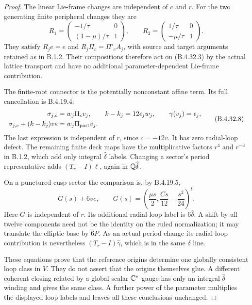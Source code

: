 \begin{proof}
The linear Lie-frame changes are independent of $c$ and $r$.
For the two generating finite peripheral changes they are
\[
 R_1=
 \begin{pmatrix}-1/\tau&0\\(1-\mu)/\tau&1\end{pmatrix},
 \qquad
 R_2=
 \begin{pmatrix}1/\tau&0\\-\mu/\tau&1\end{pmatrix}.
 \tag{B.4.32.7}
\]
They satisfy $R_je=e$ and $R_j\Pi_c=\Pi'_cA_j$, with
source and target arguments retained as in B.1.2. Their
compositions therefore act on (B.4.32.3) by the actual lattice
transport and have no additional parameter-dependent
Lie-frame contribution.

The finite-root connector is the potentially nonconstant
affine term. Its full cancellation is B.4.19.4:
\[
 \begin{split}
  \sigma_{j,c}&=w_j\Pi_c v_j,\qquad
   k-k_j=12\epsilon_jw_j,\qquad
   \gamma(v_j)=\epsilon_j,\\
  \sigma_{j,c}+(k-k_j)ve
     &=w_j\Pi_{\rm part}v_j .
 \end{split}
 \tag{B.4.32.8}
\]
The last expression is independent of $r$, since $c=-12v$.
It has zero radial-loop defect. The remaining finite deck
maps have the multiplicative factors $r^4$ and $r^{-3}$
in B.1.2, which add only integral $\widehat\delta$ labels.
Changing a sector's period representative adds
$(T_r-I)\ell$, again in $\mathbb Q\widehat\delta$.

On a punctured cusp sector the comparison is, by B.4.19.5,
\[
 G(s)+6ve,\qquad
 G(s)=\left(\frac{\mu s}{2},
                 \frac{Cs}{12}-\frac{s^2}{24}\right)^t .
 \tag{B.4.32.9}
\]
Here $G$ is independent of $r$. Its additional radial-loop
label is $6\widehat\delta$. A shift by all twelve components
need not be the identity on the ruled normalization; it may
translate the elliptic base by $6P$. As an actual period
change its radial-loop contribution is nevertheless
$(T_r-I)\widehat\gamma$, which is in the same $\delta$ line.

These equations prove that the reference origins determine one
globally consistent loop class in $V$. They do not assert that
the origins themselves glue. A different coherent closing
related by a global scalar $\mathbb C^*$ gauge has only an integral
$\widehat\delta$ winding and gives the same class. A further
power of the parameter multiplies the displayed loop labels
and leaves all these conclusions unchanged.


\end{proof}
